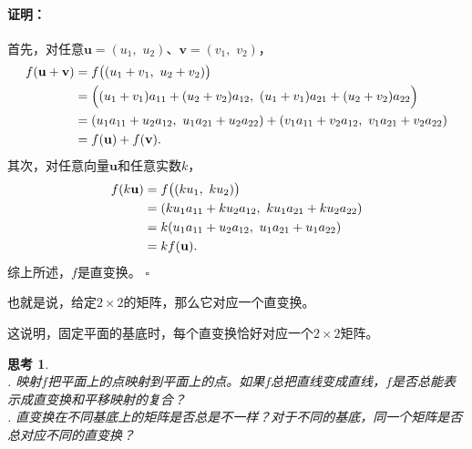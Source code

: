 \documentclass[12pt,UTF8]{ctexbook}
\renewenvironment{proof}{\paragraph{\textbf{证明：}}}{\hfill$\square$}
\newtheorem{sk}{思考}[section]
\begin{document}
\begin{proof}
    首先，对任意$\mathbf{u} = (u_1,\,\, u_2)$、$\mathbf{v} = (v_1,\,\,v_2)$，
    \begin{align}
        f (\mathbf{u} + \mathbf{v}) &= f \big((u_1 + v_1,\,\, u_2 + v_2)\big) \notag \\
        &= \Big((u_1 + v_1)a_{11} + (u_2 + v_2)a_{12},\,\,(u_1 + v_1)a_{21} + (u_2 + v_2)a_{22}\Big)\notag \\
        &= (u_1a_{11} + u_2a_{12},\,\,u_1a_{21} + u_2a_{22}) + (v_1a_{11} + v_2a_{12},\,\,v_1a_{21} + v_2a_{22})\notag \\
        &= f (\mathbf{u}) + f (\mathbf{v}). \notag
    \end{align}
    其次，对任意向量$\mathbf{u}$和任意实数$k$，
    \begin{align}
        f (k\mathbf{u}) &= f \big((ku_1,\,\, ku_2)\big) \notag \\
        &= (ku_1a_{11} + ku_2a_{12},\,\,ku_1a_{21} + ku_2a_{22})\notag \\
        &= k(u_1a_{11} + u_2a_{12},\,\,u_1a_{21} + u_1a_{22})\notag \\
        &= kf (\mathbf{u}). \notag
    \end{align}  
    综上所述，$f$是直变换。
\end{proof}

也就是说，给定$2\times 2$的矩阵，那么它对应一个直变换。

这说明，固定平面的基底时，每个直变换恰好对应一个$2\times 2$矩阵。

\begin{sk}
    \mbox{} \\
    . 映射$f$把平面上的点映射到平面上的点。如果$f$总把直线变成直线，$f$是否总能表示成直变换和平移映射的复合？\\
    . 直变换在不同基底上的矩阵是否总是不一样？对于不同的基底，同一个矩阵是否总对应不同的直变换？
\end{sk}
\end{document}
